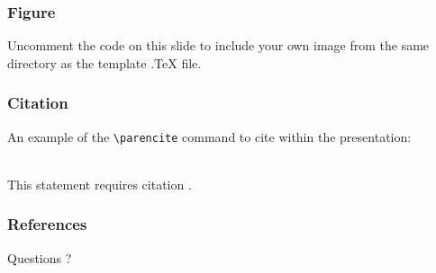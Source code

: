 \documentclass[french]{beamer}
\begin{document}

\begin{frame}
\frametitle{Figure}
Uncomment the code on this slide to include your own image from the same directory as the template .TeX file.
\end{frame}


\begin{frame}[fragile] %
\frametitle{Citation}
An example of the \verb|\parencite| command to cite within the presentation:\\~

This statement requires citation \parencite{Ganter1999}.
\end{frame}

\begin{frame}[allowframebreaks]
\frametitle{References}
\printbibliography
\end{frame}
\begin{frame}
\Huge{\centerline{Questions ?}}
\end{frame}
\end{document}
